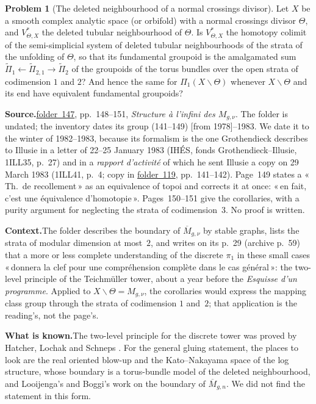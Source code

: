 \documentclass[11pt]{article}
\newcommand{\q}[1]{«\,#1\,»}
\newcommand{\fac}[1]{\href{https://grothendieck.umontpellier.fr/#1.pdf}{folder~#1}}
\theoremstyle{definition}
\newtheorem{problem}{Problem}
\theoremstyle{plain}\newtheorem*{proposition}{Proposition}\theoremstyle{definition}
\newcommand{\entry}[1]{\par\medskip\noindent\textbf{#1}\enspace}
\newcommand{\src}[1]{\entry{Source.}#1}
\newcommand{\ctx}{\entry{Context.}}
\newcommand{\known}{\entry{What is known.}}
\begin{document}
\begin{problem}[The deleted neighbourhood of a normal crossings divisor]\label{p:nc}
Let $X$ be a smooth complex analytic space (or orbifold) with a normal crossings divisor $\Theta$, and $V^*_{\Theta,X}$ the deleted tubular neighbourhood of $\Theta$. Is $V^*_{\Theta,X}$ the homotopy colimit of the semi-simplicial system of deleted tubular neighbourhoods of the strata of the unfolding of $\Theta$, so that its fundamental groupoid is the amalgamated sum $\tilde\Pi_1 \leftarrow \tilde\Pi_{2,1} \rightarrow \tilde\Pi_2$ of the groupoids of the torus bundles over the open strata of codimension $1$ and $2$? And hence the same for $\Pi_1(X \smallsetminus \Theta)$ whenever $X \smallsetminus \Theta$ and its end have equivalent fundamental groupoids?
\end{problem}

\src{\fac{147}, pp.~148--151, \emph{Structure à l'infini des $M_{g,\nu}$}. The folder is undated; the inventory dates its group (141--149) [from 1978]--1983. We date it to the winter of 1982--1983, because its formalism is the one Grothendieck describes to Illusie in a letter of 22--25 January 1983 (IHÉS, fonds Grothendieck--Illusie, 1ILL35, p.~27) and in a \emph{rapport d'activité} of which he sent Illusie a copy on 29 March 1983 (1ILL41, p.~4; copy in \fac{119}, pp.~141--142). Page~149 states a \q{Th.\ de recollement} as an equivalence of topoi and corrects it at once: \q{en fait, c'est une équivalence d'homotopie}. Pages~150--151 give the corollaries, with a purity argument for neglecting the strata of codimension~$3$. No proof is written.}

\ctx The folder describes the boundary of $\overline M_{g,\nu}$ by stable graphs, lists the strata of modular dimension at most~$2$, and writes on its p.~29 (archive p.~59) that a more or less complete understanding of the discrete $\pi_1$ in these small cases \q{donnera la clef pour une compréhension complète dans le cas général}: the two-level principle of the Teichmüller tower, about a year before the \emph{Esquisse d'un programme}. Applied to $X \smallsetminus \Theta = M_{g,\nu}$, the corollaries would express the mapping class group through the strata of codimension $1$ and~$2$; that application is the reading's, not the page's.

\known The two-level principle for the discrete tower was proved by Hatcher, Lochak and Schneps \cite{hls}. For the general gluing statement, the places to look are the real oriented blow-up and the Kato--Nakayama space of the log structure, whose boundary is a torus-bundle model of the deleted neighbourhood, and Looijenga's and Boggi's work on the boundary of $\overline M_{g,n}$. We did not find the statement in this form.
\end{document}
